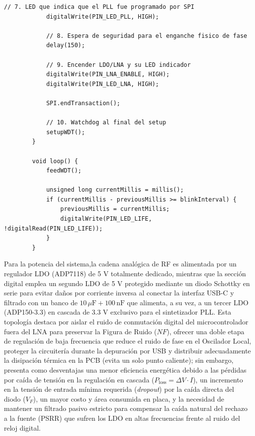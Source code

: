 \documentclass[11pt,a4paper,twoside]{report}
\begin{document}
\begin{lstlisting}[style=arduino, caption={Codigo main.c del microcontrolador}]
			// 7. LED que indica que el PLL fue programado por SPI
			digitalWrite(PIN_LED_PLL, HIGH);
			
			// 8. Espera de seguridad para el enganche fisico de fase
			delay(150);
			
			// 9. Encender LDO/LNA y su LED indicador
			digitalWrite(PIN_LNA_ENABLE, HIGH);
			digitalWrite(PIN_LED_LNA, HIGH);
			
			SPI.endTransaction();
			
			// 10. Watchdog al final del setup
			setupWDT();
		}
		
		void loop() {
			feedWDT();
			
			unsigned long currentMillis = millis();
			if (currentMillis - previousMillis >= blinkInterval) {
				previousMillis = currentMillis;
				digitalWrite(PIN_LED_LIFE, !digitalRead(PIN_LED_LIFE));
			}
		}
	\end{lstlisting}\newpage
	
	Para la potencia del sistema,la cadena analógica de RF es alimentada por un regulador LDO (ADP7118) de 5 V totalmente dedicado, mientras que la sección digital emplea un segundo LDO de 5 V protegido mediante un diodo Schottky en serie para evitar daños por corriente inversa al conectar la interfaz USB-C y filtrado con un banco de $10\,\mu\mathrm{F} + 100\,\mathrm{nF}$ que alimenta, a su vez, a un tercer LDO (ADP150-3.3) en cascada de 3.3 V exclusivo para el sintetizador PLL. Esta topología destaca por aislar el ruido de conmutación digital del microcontrolador fuera del LNA para preservar la Figura de Ruido ($NF$), ofrecer una doble etapa de regulación de baja frecuencia que reduce el ruido de fase en el Oscilador Local, proteger la circuitería durante la depuración por USB y distribuir adecuadamente la disipación térmica en la PCB (evita un solo punto caliente); sin embargo, presenta como desventajas una menor eficiencia energética debido a las pérdidas por caída de tensión en la regulación en cascada ($P_{\mathrm{loss}} = \Delta V \cdot I$), un incremento en la tensión de entrada mínima requerida (\textit{dropout}) por la caída directa del diodo ($V_F$), un mayor costo y área consumida en placa, y la necesidad de mantener un filtrado pasivo estricto para compensar la caída natural del rechazo a la fuente (PSRR) que sufren los LDO en altas frecuencias frente al ruido del reloj digital.\newline
	
\end{document}
